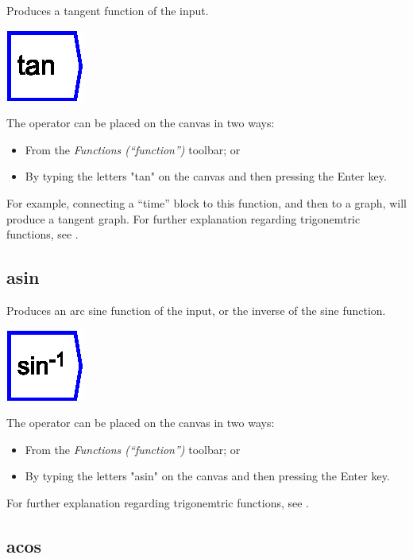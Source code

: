 \label{Operation:tan} Produces a tangent function of the input.

\includegraphics{images/tan}

The operator can be placed on the canvas in two ways:
\begin{itemize}
\item From the \emph{Functions (``function'')} toolbar; or 
\item By typing the letters "tan" on the canvas and then pressing the
Enter key.
\end{itemize}
For example, connecting a ``time'' block to this function, and then
to a graph, will produce a tangent graph. For further explanation
regarding trigonemtric functions, see .

\subsection{asin}

\label{Operation:asin} Produces an arc sine function of the input,
or the inverse of the sine function.

\includegraphics{images/sin-1}

The operator can be placed on the canvas in two ways:
\begin{itemize}
\item From the \emph{Functions (``function'')} toolbar; or 
\item By typing the letters "asin" on the canvas and then pressing the
Enter key.
\end{itemize}
For further explanation regarding trigonemtric functions, see .

\subsection{acos}

